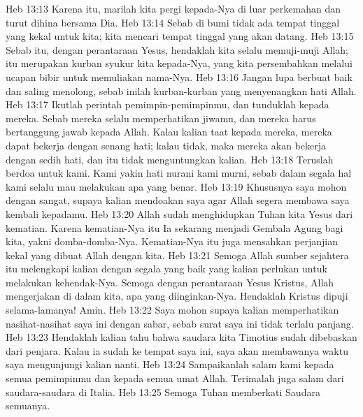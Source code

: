 Heb 13:13  Karena itu, marilah kita pergi kepada-Nya di luar perkemahan dan turut dihina bersama Dia.
Heb 13:14  Sebab di bumi tidak ada tempat tinggal yang kekal untuk kita; kita mencari tempat tinggal yang akan datang.
Heb 13:15  Sebab itu, dengan perantaraan Yesus, hendaklah kita selalu memuji-muji Allah; itu merupakan kurban syukur kita kepada-Nya, yang kita persembahkan melalui ucapan bibir untuk memuliakan nama-Nya.
Heb 13:16  Jangan lupa berbuat baik dan saling menolong, sebab inilah kurban-kurban yang menyenangkan hati Allah.
Heb 13:17  Ikutlah perintah pemimpin-pemimpinmu, dan tunduklah kepada mereka. Sebab mereka selalu memperhatikan jiwamu, dan mereka harus bertanggung jawab kepada Allah. Kalau kalian taat kepada mereka, mereka dapat bekerja dengan senang hati; kalau tidak, maka mereka akan bekerja dengan sedih hati, dan itu tidak menguntungkan kalian.
Heb 13:18  Teruslah berdoa untuk kami. Kami yakin hati nurani kami murni, sebab dalam segala hal kami selalu mau melakukan apa yang benar.
Heb 13:19  Khususnya saya mohon dengan sangat, supaya kalian mendoakan saya agar Allah segera membawa saya kembali kepadamu.
Heb 13:20  Allah sudah menghidupkan Tuhan kita Yesus dari kematian. Karena kematian-Nya itu Ia sekarang menjadi Gembala Agung bagi kita, yakni domba-domba-Nya. Kematian-Nya itu juga mensahkan perjanjian kekal yang dibuat Allah dengan kita.
Heb 13:21  Semoga Allah sumber sejahtera itu melengkapi kalian dengan segala yang baik yang kalian perlukan untuk melakukan kehendak-Nya. Semoga dengan perantaraan Yesus Kristus, Allah mengerjakan di dalam kita, apa yang diinginkan-Nya. Hendaklah Kristus dipuji selama-lamanya! Amin.
Heb 13:22  Saya mohon supaya kalian memperhatikan nasihat-nasihat saya ini dengan sabar, sebab surat saya ini tidak terlalu panjang.
Heb 13:23  Hendaklah kalian tahu bahwa saudara kita Timotius sudah dibebaskan dari penjara. Kalau ia sudah ke tempat saya ini, saya akan membawanya waktu saya mengunjungi kalian nanti.
Heb 13:24  Sampaikanlah salam kami kepada semua pemimpinmu dan kepada semua umat Allah. Terimalah juga salam dari saudara-saudara di Italia.
Heb 13:25  Semoga Tuhan memberkati Saudara semuanya.


